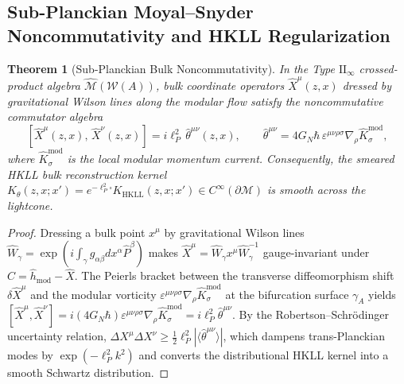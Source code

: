 \documentclass[11pt,a4paper]{article}
\theoremstyle{plain}
\newtheorem{theorem}{Theorem}[section]
\theoremstyle{definition}
\theoremstyle{remark}
\newcommand{\M}{\mathcal{M}}
\newcommand{\W}{\mathcal{W}}
\begin{document}
\subsection{Sub-Planckian Moyal--Snyder Noncommutativity and HKLL Regularization}

\begin{theorem}[Sub-Planckian Bulk Noncommutativity]
\label{thm:hkll}
In the Type $\mathrm{II}_\infty$ crossed-product algebra $\widehat{\M}(\W(A))$, bulk coordinate operators $\hat{X}^\mu(z,x)$ dressed by gravitational Wilson lines along the modular flow satisfy the noncommutative commutator algebra
\begin{equation}
  \left[ \hat{X}^\mu(z,x), \, \hat{X}^\nu(z,x) \right] = i \ell_P^2 \, \hat{\theta}^{\mu\nu}(z,x), \qquad \hat{\theta}^{\mu\nu} = 4 G_N \hbar \, \varepsilon^{\mu\nu\rho\sigma} \nabla_\rho \hat{K}_\sigma^{\mathrm{mod}},
\end{equation}
where $\hat{K}_\sigma^{\mathrm{mod}}$ is the local modular momentum current. Consequently, the smeared HKLL bulk reconstruction kernel $K_\theta(z,x;x') = e^{-\ell_P^2 \square} K_{\mathrm{HKLL}}(z,x;x') \in C^\infty(\partial\M)$ is smooth across the lightcone.
\end{theorem}

\begin{proof}
Dressing a bulk point $x^\mu$ by gravitational Wilson lines $\hat{W}_\gamma = \exp(i \int_\gamma g_{\alpha\beta} dx^\alpha \hat{P}^\beta)$ makes $\hat{X}^\mu = \hat{W}_\gamma x^\mu \hat{W}_\gamma^{-1}$ gauge-invariant under $\hat{C} = \hat{h}_{\mathrm{mod}} - \hat{X}$. The Peierls bracket between the transverse diffeomorphism shift $\delta \hat{X}^\mu$ and the modular vorticity $\varepsilon^{\mu\nu\rho\sigma}\nabla_\rho \hat{K}_\sigma^{\mathrm{mod}}$ at the bifurcation surface $\gamma_A$ yields $[\hat{X}^\mu, \hat{X}^\nu] = i(4G_N\hbar)\varepsilon^{\mu\nu\rho\sigma}\nabla_\rho \hat{K}_\sigma^{\mathrm{mod}} = i\ell_P^2 \hat{\theta}^{\mu\nu}$. By the Robertson--Schr\"odinger uncertainty relation, $\Delta X^\mu \Delta X^\nu \ge \frac{1}{2}\ell_P^2 |\langle \hat{\theta}^{\mu\nu}\rangle|$, which dampens trans-Planckian modes by $\exp(-\ell_P^2 k^2)$ and converts the distributional HKLL kernel into a smooth Schwartz distribution.
\end{proof}

\end{document}
